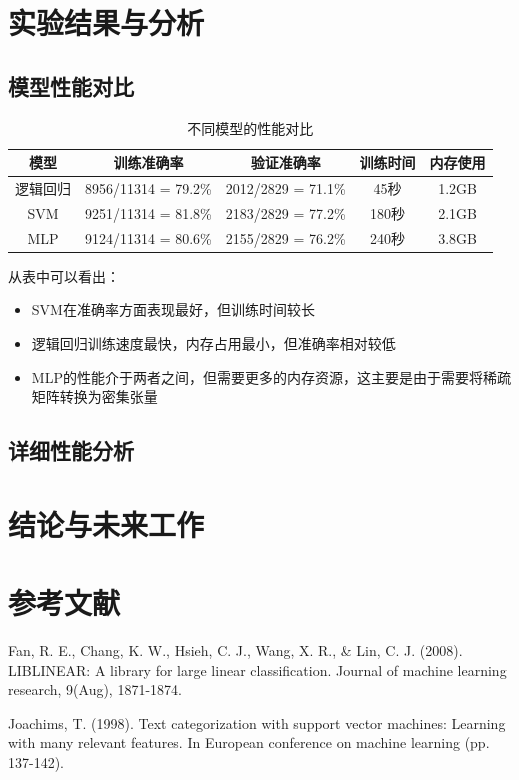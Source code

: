 \documentclass[11pt,a4paper]{article}
\begin{document}
\section{实验结果与分析}
\subsection{模型性能对比}
\begin{table}[!t]
\caption{不同模型的性能对比}
\begin{center}
\begin{tabular}{|c|c|c|c|c|}
\hline
模型 & 训练准确率 & 验证准确率 & 训练时间 & 内存使用 \\ \hline
逻辑回归 & 8956/11314 = 79.2\% & 2012/2829 = 71.1\% & 45秒 & 1.2GB \\ 
SVM & 9251/11314 = 81.8\% & 2183/2829 = 77.2\% & 180秒 & 2.1GB \\
MLP & 9124/11314 = 80.6\% & 2155/2829 = 76.2\% & 240秒 & 3.8GB \\ \hline
\end{tabular}
\end{center}
\end{table}

从表中可以看出：
\begin{itemize}
    \item SVM在准确率方面表现最好，但训练时间较长
    \item 逻辑回归训练速度最快，内存占用最小，但准确率相对较低
    \item MLP的性能介于两者之间，但需要更多的内存资源，这主要是由于需要将稀疏矩阵转换为密集张量
\end{itemize}

\subsection{详细性能分析}

\section{结论与未来工作}

\section{参考文献}
\begin{thebibliography}{00}
 Fan, R. E., Chang, K. W., Hsieh, C. J., Wang, X. R., \& Lin, C. J. (2008). LIBLINEAR: A library for large linear classification. Journal of machine learning research, 9(Aug), 1871-1874.

 Joachims, T. (1998). Text categorization with support vector machines: Learning with many relevant features. In European conference on machine learning (pp. 137-142).

\end{thebibliography}
\end{document}
